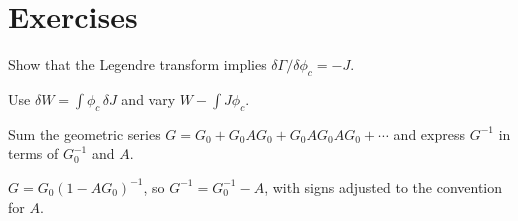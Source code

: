 \section*{Exercises}

\begin{exercise}
Show that the Legendre transform implies \(\delta\Gamma/\delta\phi_c=-J\).
\begin{answer}
Use \(\delta W=\int\phi_c\,\delta J\) and vary \(W-\int J\phi_c\).
\end{answer}
\end{exercise}

\begin{exercise}
Sum the geometric series \(G=G_0+G_0AG_0+G_0AG_0AG_0+\cdots\) and express \(G^{-1}\) in terms of \(G_0^{-1}\) and \(A\).
\begin{answer}
\(G=G_0(1-AG_0)^{-1}\), so \(G^{-1}=G_0^{-1}-A\), with signs adjusted to the convention for \(A\).
\end{answer}
\end{exercise}
